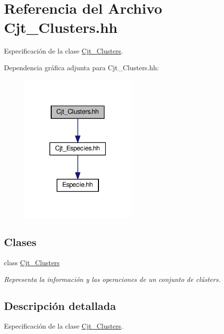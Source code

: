 \hypertarget{_cjt___clusters_8hh}{}\section{Referencia del Archivo Cjt\+\_\+\+Clusters.\+hh}
\label{_cjt___clusters_8hh}


Especificación de la clase \hyperlink{class_cjt___clusters}{Cjt\+\_\+\+Clusters}.  


Dependencia gráfica adjunta para Cjt\+\_\+\+Clusters.\+hh\+:\nopagebreak
\begin{figure}[H]
\begin{center}
\leavevmode
\includegraphics[width=165pt]{_cjt___clusters_8hh__incl}
\end{center}
\end{figure}
\subsection*{Clases}
\begin{DoxyCompactItemize}
\item 
class \hyperlink{class_cjt___clusters}{Cjt\+\_\+\+Clusters}
\begin{DoxyCompactList}\small\item\em Representa la información y las operaciones de un conjunto de clústers. \end{DoxyCompactList}\end{DoxyCompactItemize}


\subsection{Descripción detallada}
Especificación de la clase \hyperlink{class_cjt___clusters}{Cjt\+\_\+\+Clusters}. 

